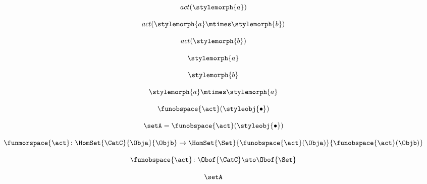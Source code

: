 \begin{forslides}
    \begin{equation}
        \label{eq:slides-processes-66}
        act (\stylemorph{a})
    \end{equation}

    \begin{equation}
        \label{eq:slides-processes-67}
        act ( \stylemorph{a} \mtimes \stylemorph{b})
    \end{equation}

    \begin{equation}
        \label{eq:slides-processes-68}
        act (\stylemorph{b})
    \end{equation}

    \begin{equation}
        \label{eq:slides-processes-69}
        \stylemorph{a}
    \end{equation}

    \begin{equation}
        \label{eq:slides-processes-70}
        \stylemorph{b}
    \end{equation}

    \begin{equation}
        \label{eq:slides-processes-71}
        \stylemorph{a} \mtimes \stylemorph{a}
    \end{equation}

    \begin{equation}
        \label{eq:slides-processes-72}
         \funobspace{\act} (\styleobj{\bullet})
    \end{equation}

    \begin{equation}
        \label{eq:slides-processes-73}
        \setA = \funobspace{\act} (\styleobj{\bullet})
    \end{equation}

    \begin{equation}
        \label{eq:slides-processes-74}
        \funmorspace{\act} \colon  \HomSet{\CatC}{\Obja}{\Objb} \to \HomSet{\Set}{ \funobspace{\act}(\Obja)}{\funobspace{\act}(\Objb)}
    \end{equation}

    \begin{equation}
        \label{eq:slides-processes-75}
        \funobspace{\act} \colon \Obof{\CatC} \sto \Obof{\Set}
    \end{equation}

    \begin{equation}
        \label{eq:slides-processes-76}
        \setA
    \end{equation}


\end{forslides}
